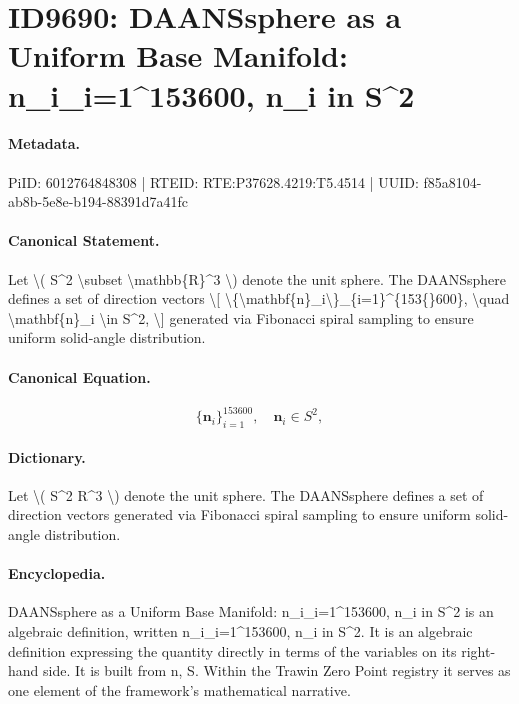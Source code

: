 \section*{ID9690: DAANSsphere as a Uniform Base Manifold: n\_i\_i=1\textasciicircum{}153600, n\_i in S\textasciicircum{}2}
\paragraph{Metadata.}
PiID: 6012764848308 | RTEID: RTE:P37628.4219:T5.4514 | UUID: f85a8104-ab8b-5e8e-b194-88391d7a41fc

\paragraph{Canonical Statement.}
Let \textbackslash{}( S\textasciicircum{}2 \textbackslash{}subset \textbackslash{}mathbb\{R\}\textasciicircum{}3 \textbackslash{}) denote the unit sphere. The DAANSsphere defines a set of direction vectors \textbackslash{}[ \textbackslash{}\{\textbackslash{}mathbf\{n\}\_i\textbackslash{}\}\_\{i=1\}\textasciicircum{}\{153\{\}600\}, \textbackslash{}quad \textbackslash{}mathbf\{n\}\_i \textbackslash{}in S\textasciicircum{}2, \textbackslash{}] generated via Fibonacci spiral sampling to ensure uniform solid-angle distribution.

\paragraph{Canonical Equation.}
\[
\{\mathbf{n}_i\}_{i=1}^{153{}600}, \quad \mathbf{n}_i \in S^2,
\]

\paragraph{Dictionary.}
Let \textbackslash{}( S\textasciicircum{}2 R\textasciicircum{}3 \textbackslash{}) denote the unit sphere. The DAANSsphere defines a set of direction vectors generated via Fibonacci spiral sampling to ensure uniform solid-angle distribution.

\paragraph{Encyclopedia.}
DAANSsphere as a Uniform Base Manifold: n\_i\_i=1\textasciicircum{}153600, n\_i in S\textasciicircum{}2 is an algebraic definition, written n\_i\_i=1\textasciicircum{}153600, n\_i in S\textasciicircum{}2. It is an algebraic definition expressing the quantity directly in terms of the variables on its right-hand side. It is built from n, S. Within the Trawin Zero Point registry it serves as one element of the framework's mathematical narrative.
